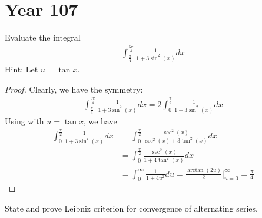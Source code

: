 \documentclass{report}
\begin{document}
\section{Year 107}
\begin{question}{}{}
Evaluate the integral
\begin{align*}
\int^{\frac{5\pi }{4} }_{\frac{\pi }{4}} \frac{1}{1+3 \sin^2(x)}dx
\end{align*}
Hint: Let $u=\tan x$. 
\end{question}
\begin{proof}
Clearly, we have the symmetry: 
\begin{align*}
\int^{\frac{5\pi }{4} }_{\frac{\pi }{4}} \frac{1}{1+3 \sin^2(x)}dx= 2\int_0^{\frac{\pi}{2}} \frac{1}{1+3 \sin ^2(x)} dx
\end{align*}
Using  with $u=\tan x$, we have
\begin{align*}
\int^{\frac{\pi }{2}}_0 \frac{1}{1+3 \sin^2(x)}dx&= \int_0^{\frac{\pi }{2}} \frac{\sec^2 (x)}{\sec^2(x)+3 \tan^2(x)}dx \\
&=\int_0^{\frac{\pi}{2}} \frac{\sec^2 (x)}{1+ 4\tan^2(x)}dx  \\
&=\int_{0}^{\infty} \frac{1}{1+4u^2}du = \frac{ \arctan (2u)}{2} \Big|_{u=0}^{\infty} = \frac{\pi }{4} 
\end{align*}
\end{proof}
\begin{question}{}{}
State and prove Leibniz criterion for convergence of alternating series. 
\end{question}
\end{document}
